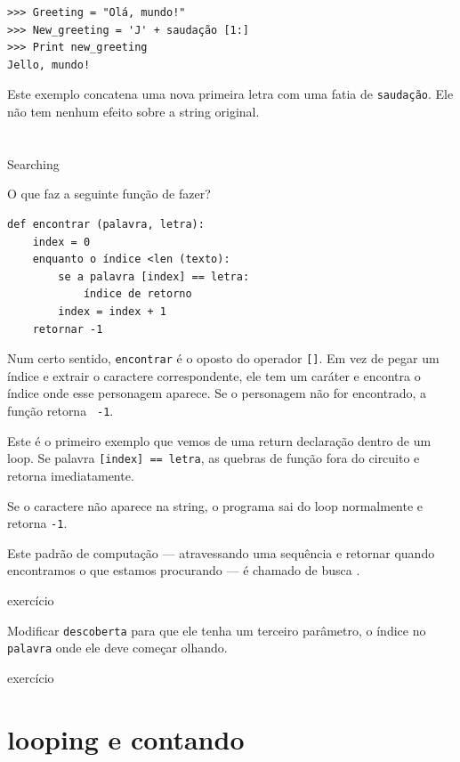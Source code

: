\documentclass[10pt]{book}
\begin{document}
\begin{verbatim}
>>> Greeting = "Olá, mundo!"
>>> New_greeting = 'J' + saudação [1:]
>>> Print new_greeting
Jello, mundo!
\end{verbatim}
%
Este exemplo concatena uma nova primeira letra com
uma fatia de {\tt saudação}. Ele não tem nenhum efeito sobre
a string original.


\section{} Searching
\label{achado}

O que faz a seguinte função de fazer?

\begin{verbatim}
def encontrar (palavra, letra):
    index = 0
    enquanto o índice <len (texto):
        se a palavra [index] == letra:
            índice de retorno
        index = index + 1
    retornar -1
\end{verbatim}
%
Num certo sentido, {\tt encontrar} é o oposto do operador {\tt []}.
Em vez de pegar um índice e extrair o caractere correspondente,
ele tem um caráter e encontra o índice onde esse personagem
aparece. Se o personagem não for encontrado, a função retorna {\tt
-1}.

Este é o primeiro exemplo que vemos de uma {return \tt} declaração
dentro de um loop. Se {palavra \tt [index] == letra}, as quebras de função
fora do circuito e retorna imediatamente.

Se o caractere não aparece na string, o programa
sai do loop normalmente e retorna {\tt -1}.

Este padrão de computação --- atravessando uma sequência e retornar
quando encontramos o que estamos procurando --- é chamado de busca {\bf}.

\begin{} exercício

Modificar {\tt descoberta} para que ele tenha um
terceiro parâmetro, o índice no {\tt palavra} onde ele deve começar
olhando.

\end{} exercício


\section{looping e contando}
\label{counter}
\end{document}
